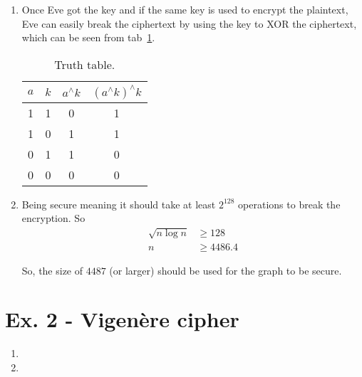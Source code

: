 \documentclass[11pt,a4paper]{article}
\begin{document}
\begin{enumerate}
	\item Once Eve got the key and if the same key is used to encrypt the plaintext, Eve can easily break the ciphertext by using the key to XOR the ciphertext, which can be seen from tab~\ref{tab:XOR}.
	\begin{table}[!ht]
		\caption{Truth table.}
		\label{tab:XOR}
		\centering
		\begin{tabular}{|c|c|c|c|}
			\hline 
			$a$ & $k$ & $a^{\wedge}k$ & $(a^{\wedge}k)^{\wedge}k$ \\ 
			\hline 
			1 & 1 & 0 & 1 \\ 
			\hline 
			1 & 0 & 1 & 1 \\ 
			\hline 
			0 & 1 & 1 & 0 \\ 
			\hline 
			0 & 0 & 0 & 0 \\ 
			\hline 
		\end{tabular}
	\end{table}
	
	\item Being secure meaning it should take at least $2^{128}$ operations to break the encryption. So
	\begin{align*}
		\sqrt{n\log n} &\geq 128 \\
		n &\geq 4486.4
	\end{align*}
	\par So, the size of $4487$ (or larger) should be used for the graph to be secure.
\end{enumerate}


\section*{Ex. 2 - Vigen\`{e}re cipher}
\begin{enumerate}
	\item 
	
	\item 
\end{enumerate}
	
\end{document}
